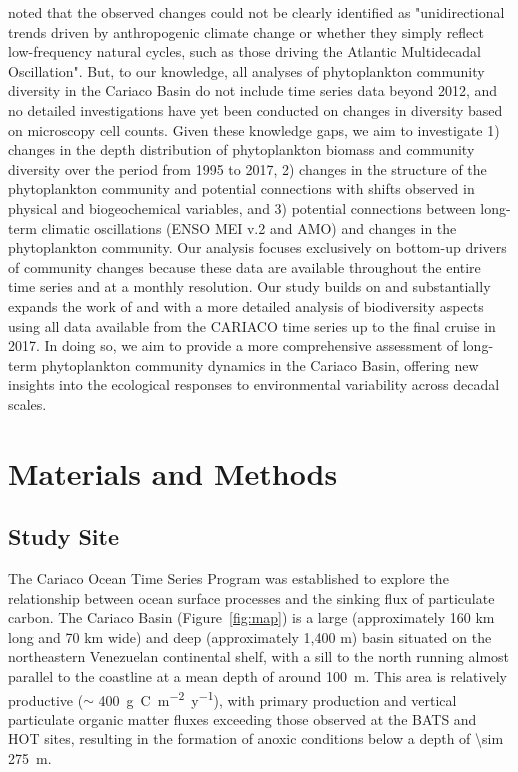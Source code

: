 \documentclass[draft]{agujournal2019}
\begin{document}
 noted that the observed changes could not be clearly identified as "unidirectional trends driven by anthropogenic climate change or whether they simply reflect low-frequency natural cycles, such as those driving the Atlantic Multidecadal Oscillation". But, to our knowledge, all analyses of phytoplankton community diversity in the Cariaco Basin do not include time series data beyond 2012, and no detailed investigations have yet been conducted on changes in diversity based on microscopy cell counts. Given these knowledge gaps, we aim to investigate 1) changes in the depth distribution of phytoplankton biomass and community diversity over the period from 1995 to 2017, 2) changes in the structure of the phytoplankton community and potential connections with shifts observed in physical and biogeochemical variables, and 3) potential connections between long-term climatic oscillations (ENSO MEI v.2 and AMO) and changes in the phytoplankton community. Our analysis focuses exclusively on bottom-up drivers of community changes because these data are available throughout the entire time series and at a monthly resolution. Our study builds on and substantially expands the work of  and  with a more detailed analysis of biodiversity aspects using all data available from the CARIACO time series up to the final cruise in 2017. In doing so, we aim to provide a more comprehensive assessment of long-term phytoplankton community dynamics in the Cariaco Basin, offering new insights into the ecological responses to environmental variability across decadal scales.
   


\section{Materials and Methods}
%
\subsection{Study Site}
    The Cariaco Ocean Time Series Program was established to explore the relationship between ocean surface processes and the sinking flux of particulate carbon. The Cariaco Basin (Figure~\ref{fig:map}) is a large (approximately 160 km long and 70 km wide) and deep (approximately 1,400 m) basin situated on the northeastern Venezuelan continental shelf, with a sill to the north running almost parallel to the coastline at a mean depth of around \qty{100}{m}. This area is relatively productive ($\sim$ \qty{400}{g.C.m^{-2}.y^{-1}}), with primary production and vertical particulate organic matter fluxes exceeding those observed at the BATS and HOT sites, resulting in the formation of anoxic conditions below a depth of  \qty{\sim 275}{m}.
\end{document}
